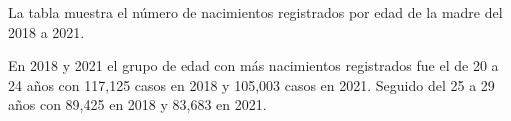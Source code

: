 La tabla muestra el número de nacimientos registrados por edad de la madre del 2018 a 2021. 

En 2018 y 2021 el grupo de edad con más nacimientos registrados fue el de 20 a 24 años con 117,125 casos en 2018 y 105,003 casos en 2021. Seguido del 25 a 29 años con 89,425 en 2018 y 83,683 en 2021.   